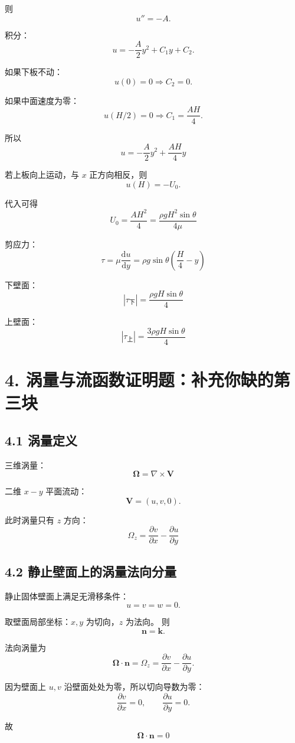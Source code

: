 \documentclass[12pt,a4paper]{ctexart}
\newcommand{\dd}{\mathrm d}
\begin{document}
则
\[
u''=-A.
\]

积分：
\[
u=-\frac{A}{2}y^2+C_1y+C_2.
\]

如果下板不动：
\[
u(0)=0\Rightarrow C_2=0.
\]

如果中面速度为零：
\[
u(H/2)=0\Rightarrow C_1=\frac{AH}{4}.
\]

所以
\[
\boxed{
u=-\frac{A}{2}y^2+\frac{AH}{4}y
}
\]

若上板向上运动，与 \(x\) 正方向相反，则
\[
u(H)=-U_0.
\]

代入可得
\[
\boxed{
U_0=\frac{AH^2}{4}
=\frac{\rho gH^2\sin\theta}{4\mu}
}
\]

剪应力：
\[
\boxed{
\tau=\mu\frac{\dd u}{\dd y}
=\rho g\sin\theta\left(\frac H4-y\right)
}
\]

下壁面：
\[
\boxed{
|\tau_{\text{下}}|
=\frac{\rho gH\sin\theta}{4}
}
\]

上壁面：
\[
\boxed{
|\tau_{\text{上}}|
=\frac{3\rho gH\sin\theta}{4}
}
\]

\section*{4. 涡量与流函数证明题：补充你缺的第三块}

\subsection*{4.1 涡量定义}

三维涡量：
\[
\boxed{
\bm\Omega=\nabla\times\bm V
}
\]

二维 \(x-y\) 平面流动：
\[
\bm V=(u,v,0).
\]

此时涡量只有 \(z\) 方向：
\[
\boxed{
\Omega_z=\frac{\partial v}{\partial x}
-\frac{\partial u}{\partial y}
}
\]

\subsection*{4.2 静止壁面上的涡量法向分量}

静止固体壁面上满足无滑移条件：
\[
u=v=w=0.
\]

取壁面局部坐标：\(x,y\) 为切向，\(z\) 为法向。
则
\[
\bm n=\bm k.
\]

法向涡量为
\[
\bm\Omega\cdot\bm n=\Omega_z
=\frac{\partial v}{\partial x}
-\frac{\partial u}{\partial y}.
\]

因为壁面上 \(u,v\) 沿壁面处处为零，所以切向导数为零：
\[
\frac{\partial v}{\partial x}=0,
\qquad
\frac{\partial u}{\partial y}=0.
\]

故
\[
\boxed{
\bm\Omega\cdot\bm n=0
}
\]
\end{document}
